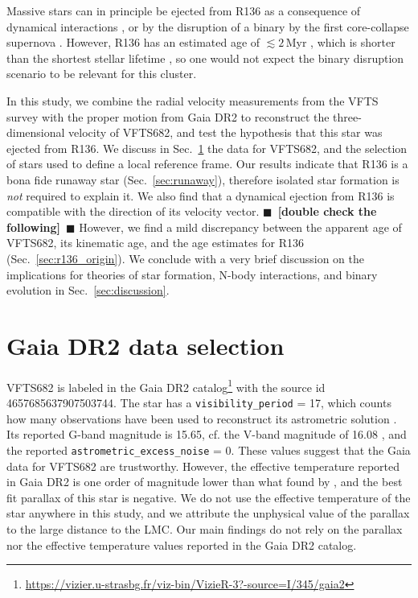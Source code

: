 \documentclass{aa}
\newcommand{\todo}[1]{{\large $\blacksquare$~\textbf{\color{red}[#1]}}~$\blacksquare$}
\DeclareRobustCommand{\Secref}[1]{Sec.~\ref{#1}}
\begin{document}
Massive stars can in principle be ejected from R136 as a consequence of dynamical
interactions \citep[][]{poveda:67,leonard:91, evans:10, fujii:11,
  allison:12, oh:16}, or by the disruption of a binary by the first
core-collapse supernova
\citep[][]{zwicky:57,blaauw:61,dedonder:97,eldridge:11,renzo:18}. However,
R136 has an estimated age of $\lesssim2$\,Myr \citep[][]{sabbi:12}, which is
shorter than the shortest stellar lifetime
\citep[$\sim$3\,Myr, e.g.,][]{zapartas:17}, so one would not expect the binary
disruption scenario to be relevant for this cluster.


In this study, we combine the radial velocity measurements from the
VFTS survey \citep[][]{evans:11} with the proper motion from Gaia DR2
to reconstruct the three-dimensional velocity of VFTS682, and test the
hypothesis that this star was ejected from R136. We discuss in
\Secref{sec:sample} the data for VFTS682, and the selection of stars
used to define a local reference frame. Our results
indicate that R136 is a bona fide runaway star (\Secref{sec:runaway}), therefore isolated star formation is \emph{not}
required to explain it. We also find that a dynamical ejection from
R136 is compatible with the direction of its velocity
vector. \todo{double check the following}
However, we find a mild discrepancy between the apparent age of
VFTS682, its kinematic age, and the age estimates for R136 (\Secref{sec:r136_origin}).  We conclude
with a very brief discussion on the implications for theories of
star formation, N-body interactions, and binary evolution in
\Secref{sec:discussion}.

\section{Gaia DR2 data selection}
\label{sec:sample}

VFTS682 is labeled in the Gaia DR2
catalog\footnote{\url{https://vizier.u-strasbg.fr/viz-bin/VizieR-3?-source=I/345/gaia2}} with the
source id 4657685637907503744. The star has a
\texttt{visibility\_period} = 17, which counts how many observations have
been used to reconstruct its astrometric solution
\citep[][]{lindengren:18}. Its reported G-band
magnitude is 15.65, cf. the V-band magnitude of 16.08
\citep[][]{evans:11, bestenlehner:11}, and the reported
\texttt{astrometric\_excess\_noise} = 0. These values suggest that the Gaia
data for VFTS682 are trustworthy. However, the effective temperature
reported in Gaia DR2 is one order of magnitude lower than what found by
\cite{bestenlehner:11}, and the best fit parallax of this star is
negative. We do not use the effective temperature of the star anywhere
in this study, and we attribute the unphysical value of the parallax
to the large distance to the LMC. Our main findings do not rely on the
parallax nor the effective temperature values reported in the Gaia DR2
catalog.
\end{document}

